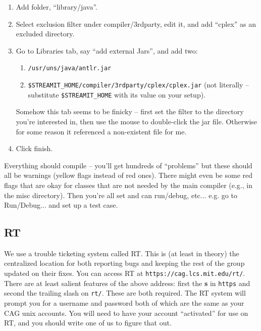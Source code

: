\begin{enumerate}
\item Add folder, ``library/java''.

\item Select exclusion filter under compiler/3rdparty, edit it, and
add ``cplex'' as an excluded directory.

\item 

Go to Libraries tab, say ``add external Jars'', and add two:
\begin{enumerate}

\item {\tt /usr/uns/java/antlr.jar}

\item {\tt \$STREAMIT\_HOME/compiler/3rdparty/cplex/cplex.jar} (not
  literally -- substitute {\tt \$STREAMIT\_HOME} with its value on
  your setup).

\end{enumerate}
Somehow this tab seems to be finicky -- first set the filter to the
directory you're interested in, then use the mouse to double-click the
jar file.  Otherwise for some reason it referenced a non-existent file
for me.

\item Click finish.

\end{enumerate}

Everything should compile -- you'll get hundreds of ``problems'' but
these should all be warnings (yellow flags instead of red ones).
There might even be some red flags that are okay for classes that are
not needed by the main compiler (e.g., in the misc directory).  Then
you're all set and can run/debug, etc... e.g. go to Run/Debug... and
set up a test case.

\subsection{RT}
We use a trouble ticketing system called RT. This is (at least
in theory) the centralized location for both reporting bugs and 
keeping the rest of the group updated on their fixes.
You can access RT at {\tt https://cag.lcs.mit.edu/rt/}. There are at least
salient features of the above address: first the {\bf s} in {\tt https}
and second the trailing slash on {\tt rt/}. These are both
required. The RT system will prompt you for a username and password
both of which are the same as your CAG unix accounts. 
You will need to have your account ``activated'' for use on 
RT, and you should write one of us to figure that out.

